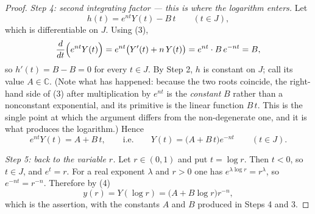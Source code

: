 \begin{proof}
\emph{Step 4: second integrating factor --- this is where the logarithm
enters.}  Let
\[
  h(t)=e^{nt}Y(t)-B\,t\qquad(t\in J),
\]
which is differentiable on $J$.  Using (3),
\[
  \frac{d}{dt}\Bigl(e^{nt}Y(t)\Bigr)=e^{nt}\bigl(Y'(t)+n\,Y(t)\bigr)
  =e^{nt}\cdot B\,e^{-nt}=B ,
\]
so $h'(t)=B-B=0$ for every $t\in J$.  By Step 2, $h$ is constant on $J$; call
its value $A\in\mathbb{C}$.  (Note what has happened: because the two roots
coincide, the right-hand side of (3) after multiplication by $e^{nt}$ is the
\emph{constant} $B$ rather than a nonconstant exponential, and its primitive is
the linear function $B\,t$.  This is the single point at which the argument
differs from the non-degenerate one, and it is what produces the logarithm.)
Hence
\begin{equation}\tag{4}
  e^{nt}Y(t)=A+B\,t,\qquad\text{i.e.}\qquad Y(t)=\bigl(A+B\,t\bigr)e^{-nt}
  \qquad(t\in J).
\end{equation}

\emph{Step 5: back to the variable $r$.}  Let $r\in(0,1)$ and put $t=\log r$.
Then $t<0$, so $t\in J$, and $e^{t}=r$.  For a real exponent $\lambda$ and
$r>0$ one has $e^{\lambda\log r}=r^{\lambda}$, so $e^{-nt}=r^{-n}$.  Therefore
by (4)
\[
  y(r)=Y(\log r)=\bigl(A+B\log r\bigr)r^{-n},
\]
which is the assertion, with the constants $A$ and $B$ produced in Steps 4
and 3.
\end{proof}
